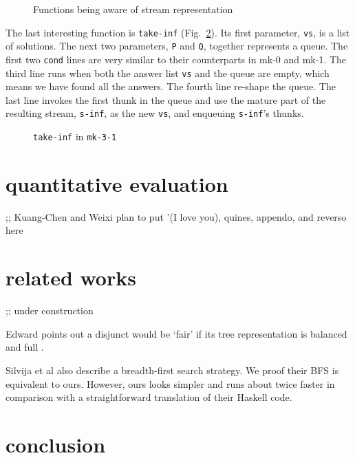 \documentclass[format=acmlarge, review=true, authordraft=true]{acmart}
\begin{document}
\begin{figure}
	 	
	 \caption{Functions being aware of stream representation}
	 \label{interface}
\end{figure}

The last interesting function is \texttt{take-inf} (Fig.~\ref{take-inf-3-1}). 
Its first parameter, \texttt{vs}, is a list of solutions. The next two parameters, \texttt{P} and \texttt{Q}, together represents a queue. 
The first two \texttt{cond} lines are very similar to their counterparts in mk-0 and mk-1. The third line runs when both the answer list \texttt{vs} and the queue are empty, which means we have found all the answers. The fourth line re-shape the queue. The last line invokes the first thunk in the queue and use the mature part of the resulting stream, \texttt{s-inf}, as the new \texttt{vs}, and enqueuing \texttt{s-inf}'s thunks. 

\begin{figure}
	 	
	 \caption{\texttt{take-inf} in \texttt{mk-3-1}}
	 \label{take-inf-3-1}
\end{figure}

\section{quantitative evaluation}

;; Kuang-Chen and Weixi plan to put '(I love you), quines, appendo, and reverso here

\section{related works}

;; under construction

Edward points out a disjunct would be `fair' if its tree representation is balanced and full \citep{yang2010adventures}.

Silvija et al \citep{seres1999algebra} also describe a breadth-first search strategy. We proof their BFS is equivalent to ours. However, ours looks simpler and runs about twice faster in comparison with a straightforward translation of their Haskell code.

\section{conclusion}
\end{document}
